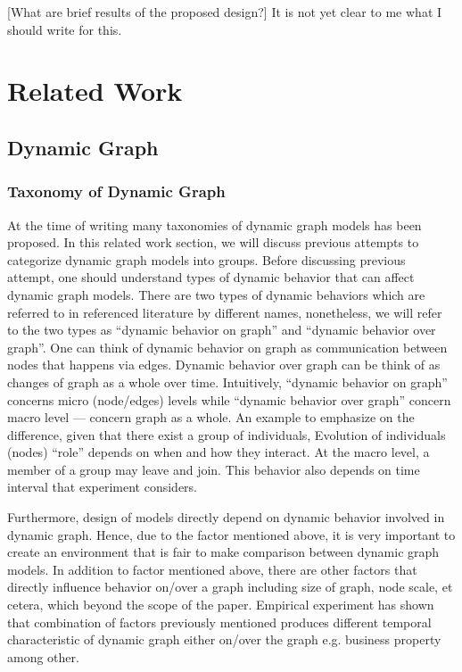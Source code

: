 \documentclass{IEEEtran}
\begin{document}
[What are brief results of the proposed design?] It is not yet clear to me what I should write for this.


\section{Related Work}
\label{sec:org5e9eb4d}
\subsection{Dynamic Graph}
\label{sec:orgb9f825b}
\subsubsection{Taxonomy of Dynamic Graph}
\label{sec:org2035fc6}
At the time of writing many taxonomies of dynamic graph models has been proposed.
In this related work section, we will discuss previous attempts to categorize dynamic graph models into groups. Before discussing previous attempt, one should understand types of dynamic behavior that can affect dynamic graph models. There are two types of dynamic behaviors which are referred to in referenced literature by different names, nonetheless, we will refer to the two types as ``dynamic behavior on graph'' and ``dynamic behavior over graph''. One can think of dynamic behavior on graph as communication between nodes that happens via edges. Dynamic  behavior over graph can be think of as changes of graph as a whole over time. Intuitively, ``dynamic behavior on graph'' concerns micro (node/edges) levels while ``dynamic behavior over graph'' concern macro level --- concern graph as a whole. An example to emphasize on the difference, given that there exist a group of individuals, Evolution of individuals (nodes) ``role'' depends on when and how they interact. At the macro level, a member of a group may leave and join. This behavior also depends on time interval that experiment considers.

Furthermore, design of models directly depend on dynamic behavior involved in dynamic graph. Hence, due to the factor mentioned above, it is very important to create an environment that is fair to make comparison between dynamic graph models. In addition to factor mentioned above, there are other factors that directly influence behavior on/over a graph including size of graph, node scale, et cetera, which beyond the scope of the paper. Empirical experiment has shown that combination of factors previously mentioned produces different temporal characteristic of dynamic graph either on/over the graph e.g. business property \cite{holme2012temporal} among other.
\end{document}

